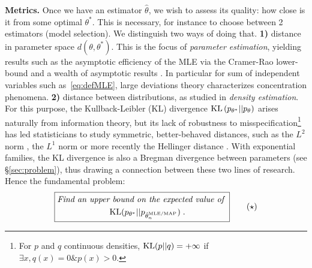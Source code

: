 \documentclass[twoside]{article}
\newcommand{\nat}{\theta}
\begin{document}
{\bf Metrics.}
Once we have an estimator $\hat \nat$, we wish to assess its quality:
how close is it from some optimal $\nat^*$.
This is necessary, for instance to choose between 2 estimators (model selection).
We distinguish two ways of doing that.
{\bf 1)} distance in parameter space $d(\nat,\nat^*)$. This is the focus of \emph{parameter estimation}, yielding results such as the asymptotic efficiency of the MLE via the Cramer-Rao lower-bound \citep{aitken1942estimation} and a wealth of asymptotic results \citep{vdv1998asymptotic}.
In particular for sum of independent variables such as~\eqref{eq:defMLE}, large deviations theory \citep{varadhan1984large} characterizes concentration phenomena.
{\bf 2)} distance between distributions, as studied in \emph{density estimation}.
For this purpose, the Kullback-Leibler (KL) divergence $\KL\paren{p_{\nat^*} || p_{\nat} }$  arises naturally from information theory,
but its lack of robustness to misspecification\footnote{
For $p$ and $q$ continuous densities,
$\mathrm{KL}(p||q) = +\infty$ if $\exists x, q(x)=0 \&p(x)>0$. 
}
has led statisticians to study symmetric, better-behaved distances, such as the $L^2$ norm \citep[\S1.2]{tsybakov2009introduction} , the $L^1$ norm \citep{devroye2001combinatorial} or more recently the Hellinger distance \citep{baraud2017new}.
With exponential families, the KL divergence is also a Bregman divergence between parameters (see \S\ref{sec:problem}), thus drawing a connection between these two lines of research.
Hence the fundamental problem:
\begin{equation}
\boxed{
\begin{aligned}
	\textit{Find an upper}&\textit{ bound on the expected value of } \\
	&\KL(p_{\nat^*} || p_{\hat \nat_n^\text{MLE/MAP} }) \; .
\end{aligned}
}
\tag{$\star$}
\label{problem}
\end{equation}
\end{document}

